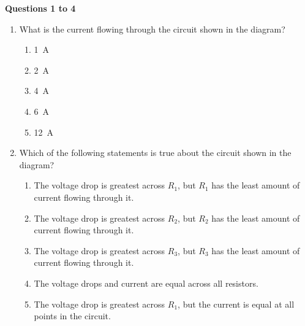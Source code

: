 \documentclass{../../../oss-apphys}
\begin{document}
\genheader


\genmultidirections

\gengravity

\raggedcolumns
\begin{multicols}{2}

  \textbf{Questions 1 to 4}  
  \begin{center}
  \end{center}
  
  \begin{enumerate}[leftmargin=18pt]

  \item What is the current flowing through the circuit shown in the diagram?
    \begin{enumerate}[noitemsep,topsep=0pt,leftmargin=18pt,label=(\Alph*)]
    \item\SI{1}{A}
    \item\SI{2}{A}
    \item\SI{4}{A}
    \item\SI{6}{A}
    \item\SI{12}{A}
    \end{enumerate}
    
  \item Which of the following statements is true about the circuit shown in the
    diagram?
    \begin{enumerate}[noitemsep,topsep=0pt,leftmargin=18pt,label=(\Alph*)]  
    \item The voltage drop is greatest across $R_1$, but $R_1$ has the least
      amount of current flowing through it.
    \item The voltage drop is greatest across $R_2$, but $R_2$ has the least
      amount of current flowing through it.
    \item The voltage drop is greatest across $R_3$, but $R_3$ has the least
      amount of current flowing through it.
    \item The voltage drops and current are equal across all resistors.
    \item The voltage drop is greatest across $R_1$, but the current is equal at
      all points in the circuit.
    \end{enumerate}


\end{enumerate}
\end{multicols}
\end{document}
